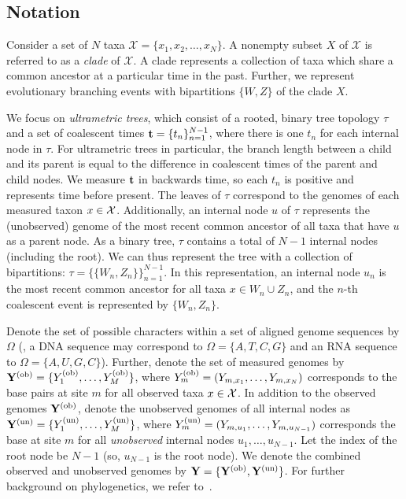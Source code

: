 \subsection{Notation}

Consider a set of $N$ taxa $\mathcal{X} = \{x_1, x_2,\ldots,x_N\}$. A nonempty subset $X$ of $\mathcal{X}$ is referred to as a \textit{clade} of $\mathcal{X}$. A clade represents a collection of taxa which share a common ancestor at a particular time in the past. Further, we represent evolutionary branching events with bipartitions $\{W,Z\}$ of the clade $X$.

We focus on \textit{ultrametric trees}, which consist of a rooted, binary tree topology $\tau$ and a set of coalescent times $\mathbf{t} = \{t_n\}_{n=1}^{N-1}$, where there is one $t_n$ for each internal node in $\tau$. For ultrametric trees in particular, the branch length between a child and its parent is equal to the difference in coalescent times of the parent and child nodes. We measure $\mathbf{t}$ in backwards time, so each $t_n$ is positive and represents time before present. 
%
The leaves of $\tau$ correspond to the genomes of each measured taxon $x \in \mathcal{X}$. Additionally, an internal node $u$ of $\tau$ represents the (unobserved) genome of the most recent common ancestor of all taxa that have $u$ as a parent node. 
%
As a binary tree, $\tau$ contains a total of $N-1$ internal nodes (including the root). We can thus represent the tree with a collection of bipartitions: $\tau = \{\{W_n,Z_n\}\}_{n=1}^{N-1}$. In this representation, an internal node $u_n$ is the most recent common ancestor for all taxa $x \in W_n \cup Z_n$, and the $n$-th coalescent event is represented by $\{W_n,Z_n\}$.

Denote the set of possible characters within a set of aligned genome sequences by $\Omega$ (\eg, a DNA sequence may correspond to $\Omega = \{A,T,C,G\}$ and an RNA sequence to $\Omega=\{A,U,G,C\}$). Further, denote the set of measured genomes by $\mathbf{Y}^{{(\text{ob})}} = \{Y^{{(\text{ob})}}_1,\ldots,Y^{{(\text{ob})}}_M\}$, where $Y^{{(\text{ob})}}_m = (Y_{m,x_1}, \ldots, Y_{m,x_N})$ corresponds to the base pairs at site $m$ for all observed taxa $x \in \mathcal{X}$. In addition to the observed genomes $\mathbf{Y}^{{(\text{ob})}}$, denote the unobserved genomes of all internal nodes as $\mathbf{Y}^{{(\text{un})}} = \{Y^{{(\text{un})}}_1,\ldots,Y^{{(\text{un})}}_M\}$, where $Y^{{(\text{un})}}_m = (Y_{m,u_1}, \ldots, Y_{m,u_{N-1}})$ corresponds the base at site $m$ for all \textit{unobserved} internal nodes $u_1,\ldots,u_{N-1}$. Let the index of the root node be $N-1$ (so, $u_{N-1}$ is the root node). We denote the combined observed and unobserved genomes by $\mathbf{Y} = \{\mathbf{Y}^{{(\text{ob})}},\mathbf{Y}^{{(\text{un})}}\}$. For further background on phylogenetics, we refer to~\citet{jotun}.

